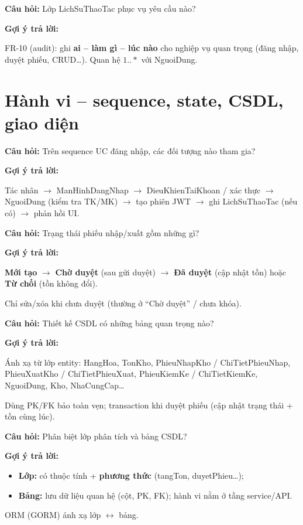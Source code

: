\documentclass[12pt,a4paper]{article}
\newcommand{\cau}[1]{\textbf{\textcolor{qblue}{Câu hỏi:}} #1}
\newcommand{\traloi}{\par\smallskip\textbf{\textcolor{qblue!70!black}{Gợi ý trả lời:}}\par}
\begin{document}
\begin{cauhoi}[Câu 27]
\cau{Lớp LichSuThaoTac phục vụ yêu cầu nào?}
\traloi
FR-10 (audit): ghi \textbf{ai -- làm gì -- lúc nào} cho nghiệp vụ quan trọng (đăng nhập, duyệt phiếu, CRUD\ldots). Quan hệ $1..*$ với NguoiDung.
\end{cauhoi}

\section{Hành vi -- sequence, state, CSDL, giao diện}

\begin{cauhoi}[Câu 28]
\cau{Trên sequence UC đăng nhập, các đối tượng nào tham gia?}
\traloi
Tác nhân $\rightarrow$ ManHinhDangNhap $\rightarrow$ DieuKhienTaiKhoan / xác thực $\rightarrow$ NguoiDung (kiểm tra TK/MK) $\rightarrow$ tạo phiên JWT $\rightarrow$ ghi LichSuThaoTac (nếu có) $\rightarrow$ phản hồi UI.
\end{cauhoi}

\begin{cauhoi}[Câu 29]
\cau{Trạng thái phiếu nhập/xuất gồm những gì?}
\traloi
\textbf{Mới tạo} $\rightarrow$ \textbf{Chờ duyệt} (sau gửi duyệt) $\rightarrow$ \textbf{Đã duyệt} (cập nhật tồn) hoặc \textbf{Từ chối} (tồn không đổi).

Chỉ sửa/xóa khi chưa duyệt (thường ở ``Chờ duyệt'' / chưa khóa).
\end{cauhoi}

\begin{cauhoi}[Câu 30]
\cau{Thiết kế CSDL có những bảng quan trọng nào?}
\traloi
Ánh xạ từ lớp entity: HangHoa, TonKho, PhieuNhapKho / ChiTietPhieuNhap, PhieuXuatKho / ChiTietPhieuXuat, PhieuKiemKe / ChiTietKiemKe, NguoiDung, Kho, NhaCungCap\ldots

Dùng PK/FK bảo toàn vẹn; transaction khi duyệt phiếu (cập nhật trạng thái + tồn cùng lúc).
\end{cauhoi}

\begin{cauhoi}[Câu 31]
\cau{Phân biệt lớp phân tích và bảng CSDL?}
\traloi
\begin{itemize}[leftmargin=1.4em,itemsep=2pt]
  \item \textbf{Lớp:} có thuộc tính + \textbf{phương thức} (tangTon, duyetPhieu\ldots);
  \item \textbf{Bảng:} lưu dữ liệu quan hệ (cột, PK, FK); hành vi nằm ở tầng service/API.
\end{itemize}
ORM (GORM) ánh xạ lớp $\leftrightarrow$ bảng.
\end{cauhoi}
\end{document}
